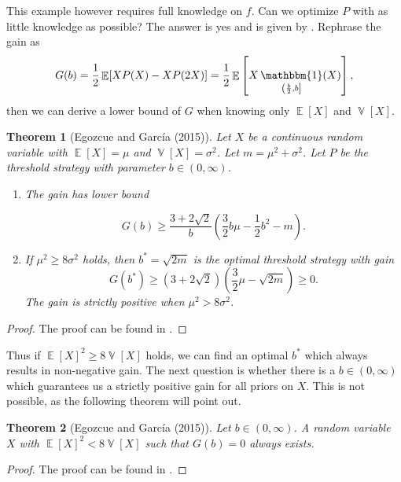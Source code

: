 \documentclass[a4paper]{report}
\theoremstyle{plain}
\newtheorem{theorem}{Theorem}[section]
\theoremstyle{definition}
\theoremstyle{remark}
\numberwithin{equation}{chapter}
\DeclareMathOperator{\V}{\mathbb{V}}
\DeclareMathOperator{\E}{\mathbb{E}}
\DeclareMathOperator{\1}{\mathbbm{1}}
\begin{document}
This example however requires full knowledge on $f$. Can we optimize $P$ with as little knowledge as possible? The answer is yes and is given by \cite{Egozcue15}. Rephrase the gain as
\begin{equation}
G(b)=\frac{1}{2}\E[XP(X)-XP(2X)]=\frac{1}{2}\E\left[X\1_{\left(\frac{b}{2},b\right]}(X)\right],
\end{equation}
then we can derive a lower bound of $G$ when knowing only $\E[X]$ and $\V[X]$.
\begin{theorem}[Egozcue and García (2015)]\label{thm:EnvelopeSwitchBound}
Let $X$ be a continuous random variable with $\E[X]=\mu$ and $\V[X]=\sigma^2$. Let $m=\mu^2+\sigma^2$. Let $P$ be the threshold strategy with parameter $b\in(0,\infty)$.
\begin{enumerate}
    \item The gain has lower bound

       \begin{equation}
    G(b)\geq\frac{3+2\sqrt{2}}{b}\left(\frac{3}{2}b\mu-\frac{1}{2}b^2-m\right).
    \end{equation}
    \item If $\mu^2\geq 8\sigma^2$ holds, then $b^*=\sqrt{2m}$ is the optimal threshold strategy with gain
        \begin{equation}
    G(b^*)\geq(3+2\sqrt{2})\left(\frac{3}{2}\mu-\sqrt{2m}\right)\geq0.
    \end{equation}
    The gain is strictly positive when $\mu^2>8\sigma^2$.
\end{enumerate}
\end{theorem}
\begin{proof}
The proof can be found in \cite{Egozcue15}.
\end{proof}
Thus if $\E[X]^2\geq8\V[X]$ holds, we can find an optimal $b^*$ which always results in non-negative gain. The next question is whether there is a $b\in(0,\infty)$ which guarantees us a strictly positive gain for all priors on $X$. This is not possible, as the following theorem will point out.
\begin{theorem}[Egozcue and García (2015)]
Let $b\in(0,\infty)$. A random variable $X$ with $\E[X]^2<8\V[X]$ such that $G(b)=0$ always exists.
\end{theorem}
\begin{proof}
The proof can be found in \cite{Egozcue15}.
\end{proof}
\end{document}
